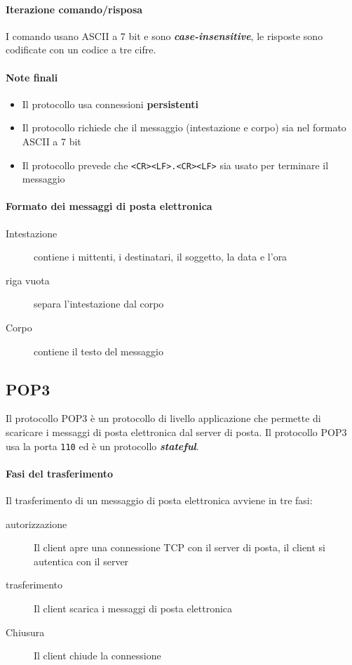         \paragraph{Iterazione comando/risposa} I comando usano \Acrshort*{ASCII} a 7 bit e sono \textit{\textbf{case-insensitive}}, le risposte sono codificate con un codice a tre cifre.
        \paragraph{Note finali} 
            \begin{itemize}
                \item Il protocollo usa connessioni \textbf{persistenti}
                \item Il protocollo richiede che il messaggio (intestazione e corpo) sia nel formato \Acrshort*{ASCII} a 7 bit
                \item Il protocollo prevede che \texttt{<CR><LF>.<CR><LF>} sia usato per terminare il messaggio
            \end{itemize}
        \paragraph{Formato dei messaggi di posta elettronica}
            \begin{description}
                \item[Intestazione]contiene i mittenti, i destinatari, il soggetto, la data e l'ora
                \item[riga vuota] separa l'intestazione dal corpo
                \item[Corpo] contiene il testo del messaggio
            \end{description}
    \subsection[Post Office Protocol (\texttt{POP3})]{\acrfull*{POP3}}
        Il protocollo \acrfull*{POP3} è un protocollo di livello applicazione che permette di scaricare i messaggi di posta elettronica dal server di posta. Il protocollo \Acrshort*{POP3} usa la porta \texttt{110} ed è un protocollo \textit{\textbf{stateful}}.
        \paragraph{Fasi del trasferimento} Il trasferimento di un messaggio di posta elettronica avviene in tre fasi:
            \begin{description}
                \item[autorizzazione] Il client apre una connessione \Acrshort*{TCP} con il server di posta, il client si autentica con il server
                \item[trasferimento] Il client scarica i messaggi di posta elettronica
                \item[Chiusura] Il client chiude la connessione
            \end{description}
